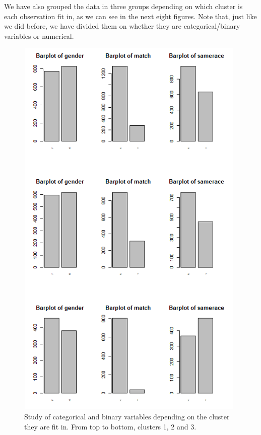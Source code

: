 We have also grouped the data in three groups depending on which cluster is each observation fit in, as we can see in the next eight figures. Note that, just like we did before, we have divided them on whether they are categorical/binary variables or numerical.

\begin{figure}
  \centering
  \includegraphics[width= 11cm, height=19cm]{images/profiling/CPG_cluster_gender_samerace.png}
  \caption{Study of categorical and binary variables depending on the cluster they are fit in. From top to bottom, clusters 1, 2 and 3.}
  \label{fig:indiv}
\end{figure}

